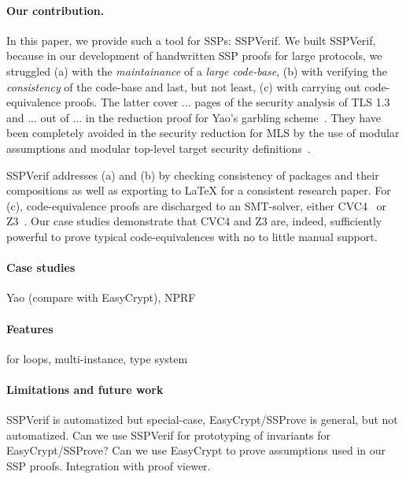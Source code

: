{\paragraph{Our contribution.} In this paper, we provide such a tool for SSPs: SSPVerif. 
We built SSPVerif, because in our development of handwritten SSP proofs for large protocols, we struggled (a) with the \emph{maintainance} of a \emph{large code-base}, (b) with verifying the \emph{consistency} of the code-base and last, but not least, (c) with carrying out code-equivalence proofs. The latter cover ... pages of the security analysis of TLS 1.3~\cite{X} and ... out of ... in the reduction proof for Yao's garbling scheme~\cite{X}. They have been completely avoided in the security reduction for MLS by the use of modular assumptions and modular top-level target security definitions~\cite{X}.

SSPVerif addresses (a) and (b) by checking consistency of packages and their compositions as well as exporting to LaTeX for a consistent research paper. For (c), code-equivalence proofs are discharged to an SMT-solver, either CVC4~\cite{X} or Z3~\cite{X}. Our case studies demonstrate that CVC4 and Z3 are, indeed, sufficiently powerful to prove typical code-equivalences with no to little manual support. 

\paragraph{Case studies}
Yao (compare with EasyCrypt), NPRF

\paragraph{Features}
for loops, multi-instance, type system

\paragraph{Limitations and future work}
SSPVerif is automatized but special-case, EasyCrypt/SSProve is general, but not automatized. Can we use SSPVerif for prototyping of invariants for EasyCrypt/SSProve? Can we use EasyCrypt to prove assumptions used in our SSP proofs. Integration with proof viewer.





}
